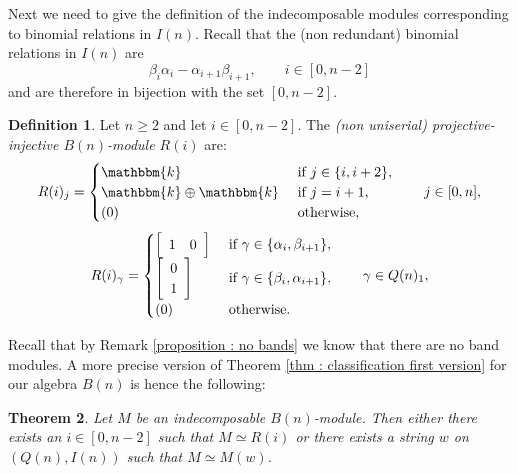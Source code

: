 \documentclass[11pt]{amsart}
\newtheorem{theorem}{Theorem}[section]
\theoremstyle{definition}
\newtheorem{definition}[theorem]{Definition}
\newcommand{\kk}{\mathbbm{k}}
\begin{document}
Next we need to give the definition of the indecomposable modules corresponding to binomial relations in $I(n)$. Recall that the (non redundant) binomial relations in $I(n)$ are \[ \beta_i\alpha_i-\alpha_{i+1}\beta_{i+1}, \qquad i\in [0,n-2]
\]
and are therefore in bijection with the set $[0,n-2]$.
\begin{definition}Let $n\geq 2$ and let $i\in[0,n-2]$. The \emph{(non uniserial) projective-injective $B(n)$-module $R(i)$} are:
    \[
    R(i)_j=\begin{cases}
        \kk&\hbox{ if }j\in\{i,i+2\},\\
        \kk\oplus\kk&\hbox{ if }j=i+1,\\
        (0)&\hbox{ otherwise}, 
    \end{cases}\qquad j\in[0,n],
    \]
     \[
    R(i)_\gamma=\begin{cases}
        \left[
        \begin{array}{cc}
             1 &0
        \end{array}
        \right]&\hbox{ if }\gamma\in\{\alpha_i,\beta_{i+1}\},\\
        \left[
        \begin{array}{c}
             0 \\
             1 
        \end{array}
        \right]&\hbox{ if }\gamma\in\{\beta_{i}, \alpha_{i+1}\},\\
        (0)&\hbox{ otherwise}. 
    \end{cases}\qquad \gamma\in Q(n)_1,
    \]
\end{definition}

Recall that by Remark \ref{proposition : no bands} we know that there are no band modules. A more precise version of Theorem \ref{thm : classification first version} for our algebra $B(n)$ is hence the following:
\begin{theorem}\label{thm:classification of indcps} Let $M$ be an indecomposable $B(n)$-module. Then either there exists an $i\in[0,n-2]$ such that $M\simeq R(i)$ or there exists a string $w$ on $(Q(n), I(n))$ such that $M\simeq  M(w)$.
\end{theorem}
\end{document}
